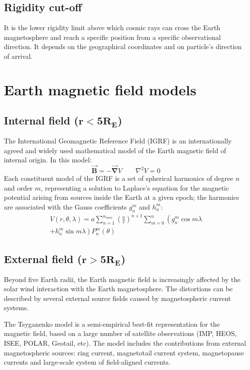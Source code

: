 \documentclass[3p,times,twocolumn]{elsarticle}
\begin{document}
\subsection*{\textbf{Rigidity cut-off}}
It is the lower rigidity limit above which cosmic rays can cross the Earth magnetosphere and reach a specific position from a specific observational direction. It depends on the geographical coordinates and on particle's direction of arrival.
\section{Earth magnetic field models}
\label{sec:Earth_geomagnetic_models}
\subsection*{\textbf{Internal field ($\boldsymbol{r<5R_E}$)}}
The International Geomagnetic Reference Field (IGRF) \cite{susan_macmillan_international_2010} is an internationally agreed and widely used mathematical model of the Earth magnetic field of internal origin. In this model:
\begin{equation}
\boldsymbol{\vec{B}}=-\boldsymbol{\vec{\nabla}}V\qquad\nabla^2V=0
\end{equation}
Each constituent model of the IGRF is a set of spherical harmonics of degree $n$ and order $m$, representing a solution to Laplace's equation for the magnetic potential arising from sources inside the Earth at a given epoch; the harmonics are associated with the Gauss coefficients $g_n^m$ and $h_n^m$:
\begin{multline}
V(r,\theta,\lambda)=a\sum_{n=1}^{n_{max}}\left(\frac{a}{r}\right)^{n+1}\sum_{m=0}^n\left(g_n^m\cos m\lambda\right.\\
\left.+h_n^m\sin m\lambda\right)P_n^m(\theta)
\end{multline}

\subsection*{\textbf{External field ($\boldsymbol{r>5R_E}$)}}
Beyond five Earth radii, the Earth magnetic field is increasingly affected by the solar wind interaction with the Earth magnetosphere. The distortions can be described by several external source fields caused by magnetospheric current systems.

The Tsyganenko model \cite{woodfield_comparison_2007} is a semi-empirical best-fit representation for the magnetic field, based on a large number of satellite observations (IMP, HEOS, ISEE, POLAR, Geotail, etc). The model includes the contributions from external magnetospheric sources: ring current, magnetotail current system, magnetopause currents and large-scale system of field-aligned currents.
\end{document}
